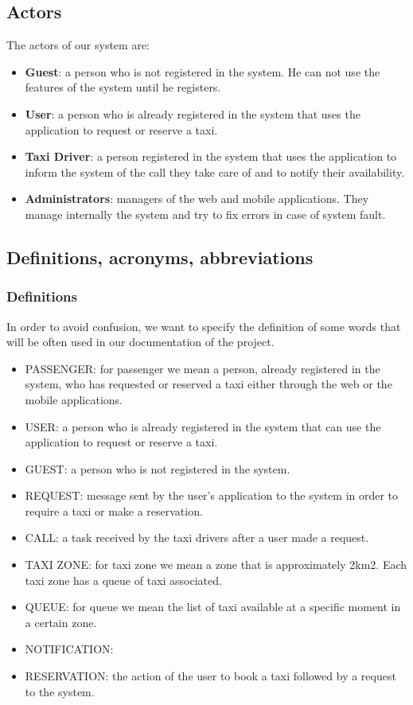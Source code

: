 \documentclass{article}
\begin{document}
	\subsection{Actors}
    	The actors of our system are:
    	\begin{itemize}
    	    \item \textbf{Guest}: a person who is not registered in the system. He can not use the features of the system until he registers. 
    		\item \textbf{User}: a person who is already registered in the system that uses the application to request or reserve a taxi.
    		\item \textbf{Taxi Driver}: a person registered in the system that uses the application to inform the system of the call they take care of and to notify their availability.
    		\item \textbf{Administrators}: managers of the web and mobile applications. They manage internally the system and try to fix errors in case of system fault.
    	\end{itemize}
	
	\subsection{Definitions, acronyms, abbreviations}
	    \subsubsection{Definitions}
    	In order to avoid confusion, we want to specify the definition of some words that will be often used in our documentation of the project. 
    	\begin{itemize}
    		\item PASSENGER: for passenger we mean a person, already registered in the system, who has requested or reserved a taxi either through the web or the mobile applications.
    		\item USER: a person who is already registered in the system that can use the application to request or reserve a taxi.
    		\item GUEST:  a person who is not registered in the system.
    		\item REQUEST: message sent by the user's application to the system in order to require a taxi or make a reservation.
    		\item CALL: a task received by the taxi drivers after a user made a request.
    		\item TAXI ZONE: for taxi zone we mean a zone that is approximately 2km2. Each taxi zone has a queue of taxi associated. 
    	    \item QUEUE: for queue we mean the list of taxi available at a specific moment in a certain zone.
    		\item NOTIFICATION: 
    		\item RESERVATION: the action of the user to book a taxi followed by a request to the system.
    	\end{itemize}
    	
\end{document}
